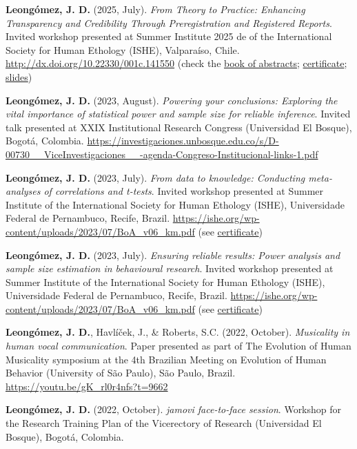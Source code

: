 \documentclass[11pt,a4paper,]{awesome-cv}
\begin{document}
\textbf{Leongómez, J. D.} (2025, July). \emph{From Theory to Practice:
Enhancing Transparency and Credibility Through Preregistration and
Registered Reports}. Invited workshop presented at Summer Institute 2025
de of the International Society for Human Ethology (ISHE), Valparaíso,
Chile. \url{http://dx.doi.org/10.22330/001c.141550} (check the
\href{https://ishe.org/wp-content/uploads/2025/07/BoA_2025.pdf}{book of
abstracts};
\href{https://jdleongomez.info/es/files/Cert_ISHE_2025.pdf}{certificate};
\href{https://jdleongomez.github.io/preregistration-and-RRs/}{slides})

\textbf{Leongómez, J. D.} (2023, August). \emph{Powering your
conclusions: Exploring the vital importance of statistical power and
sample size for reliable inference}. Invited talk presented at XXIX
Institutional Research Congress (Universidad El Bosque), Bogotá,
Colombia.
\url{https://investigaciones.unbosque.edu.co/s/D-00730__ViceInvestigaciones__-agenda-Congreso-Institucional-links-1.pdf}

\textbf{Leongómez, J. D.} (2023, July). \emph{From data to knowledge:
Conducting meta-analyses of correlations and t-tests}. Invited workshop
presented at Summer Institute of the International Society for Human
Ethology (ISHE), Universidade Federal de Pernambuco, Recife, Brazil.
\url{https://ishe.org/wp-content/uploads/2023/07/BoA_v06_km.pdf} (see
\href{https://jdleongomez.info/es/files/Cert_ISHE_2023.pdf}{certificate})

\textbf{Leongómez, J. D.} (2023, July). \emph{Ensuring reliable results:
Power analysis and sample size estimation in behavioural research}.
Invited workshop presented at Summer Institute of the International
Society for Human Ethology (ISHE), Universidade Federal de Pernambuco,
Recife, Brazil.
\url{https://ishe.org/wp-content/uploads/2023/07/BoA_v06_km.pdf} (see
\href{https://jdleongomez.info/es/files/Cert_ISHE_2023.pdf}{certificate})

\textbf{Leongómez, J. D.}, Havlíček, J., \& Roberts, S.C. (2022,
October). \emph{Musicality in human vocal communication}. Paper
presented as part of The Evolution of Human Musicality symposium at the
4th Brazilian Meeting on Evolution of Human Behavior (University of São
Paulo), São Paulo, Brazil. \url{https://youtu.be/gK_rl0r4nfs?t=9662}

\textbf{Leongómez, J. D.} (2022, October). \emph{jamovi face-to-face
session}. Workshop for the Research Training Plan of the Vicerectory of
Research (Universidad El Bosque), Bogotá, Colombia.
\end{document}
